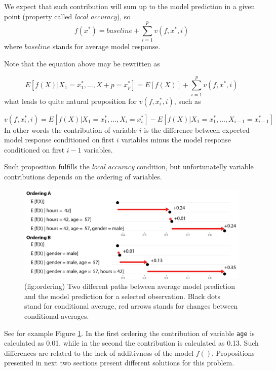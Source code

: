 \documentclass[12pt,]{krantz}
\theoremstyle{definition}
\theoremstyle{definition}
\theoremstyle{definition}
\theoremstyle{remark}
\begin{document}
We expect that such contribution will sum up to the model prediction in
a given point (property called \emph{local accuracy}), so \[
f(x^*) = baseline + \sum_{i=1}^p v(f, x^*, i)
\] where \(baseline\) stands for average model response.

Note that the equation above may be rewritten as

\[
E [f(X)|X_1 = x_1^*, \ldots, X+p = x_p^*] = E[f(X)] + \sum_{i=1}^p v(f, x^*, i)
\] what leads to quite natural proposition for \(v(f, x^*_i, i)\), such
as

\[
v(f, x^*_i, i) = E [f(X) | X_1 = x_1^*, \ldots, X_i = x_i^*] - E [f(X) | X_1 = x_1^*, \ldots, X_{i-1} = x_{i-1}^*] 
\] In other words the contribution of variable \(i\) is the difference
between expected model response conditioned on first \(i\) variables
minus the model response conditioned on first \(i-1\) variables.

Such proposition fulfills the \emph{local accuracy} condition, but
unfortunatelly variable contributions depends on the ordering of
variables.

\begin{figure}

{\centering \includegraphics[width=1\linewidth]{figure/ordering} 

}

\caption{(fig:ordering) Two different paths between average model prediction and the model prediction for a selected observation. Black dots stand for conditional average, red arrows stands for changes between conditional averages.}\label{fig:ordering}
\end{figure}

See for example Figure \ref{fig:ordering}. In the first ordering the
contribution of variable \texttt{age} is calculated as 0.01, while in
the second the contribution is calculated as 0.13. Such differences are
related to the lack of additivness of the model \(f()\). Propositions
presented in next two sections present different solutions for this
problem.
\end{document}
